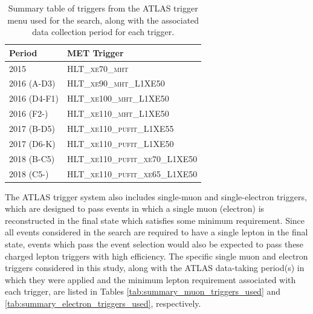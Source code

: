 \begin{table}[ht]
\caption{Summary table of \met triggers from the ATLAS trigger menu used for the search, along with the associated data collection period for each trigger.}
\label{tab:summary_triggers_used}
\footnotesize{
	\begin{center}
	\begin{tabular}{l l }
		\toprule
			\textbf{Period} & \textbf{MET Trigger} \\
			\midrule
			\midrule
			2015 & \textsc{HLT\_xe70\_mht} \\
			\midrule
			2016 (A-D3) & \textsc{HLT\_xe90\_mht\_L1XE50} \\
			\midrule
			2016 (D4-F1) & \textsc{HLT\_xe100\_mht\_L1XE50} \\
			\midrule
			2016 (F2-) & \textsc{HLT\_xe110\_mht\_L1XE50} \\
			\midrule
			2017 (B-D5) & \textsc{HLT\_xe110\_pufit\_L1XE55} \\
			\midrule
			2017 (D6-K) & \textsc{HLT\_xe110\_pufit\_L1XE50} \\
			\midrule
			2018 (B-C5) & \textsc{HLT\_xe110\_pufit\_xe70\_L1XE50} \\
			\midrule
			2018 (C5-) & \textsc{HLT\_xe110\_pufit\_xe65\_L1XE50} \\
		\bottomrule
	\end{tabular}
	\end{center}
	}
\end{table}

The ATLAS trigger system also includes single-muon and single-electron triggers, which are designed to pass events in which a single muon (electron) is reconstructed in the final state which satisfies some minimum \pt requirement. Since all events considered in the search are required to have a single lepton in the final state, events which pass the event selection would also be expected to pass these charged lepton triggers with high efficiency. The specific single muon and electron triggers considered in this study, along with the ATLAS data-taking period(s) in which they were applied and the minimum lepton \pt requirement associated with each trigger, are listed in Tables \ref{tab:summary_muon_triggers_used} and \ref{tab:summary_electron_triggers_used}, respectively.

